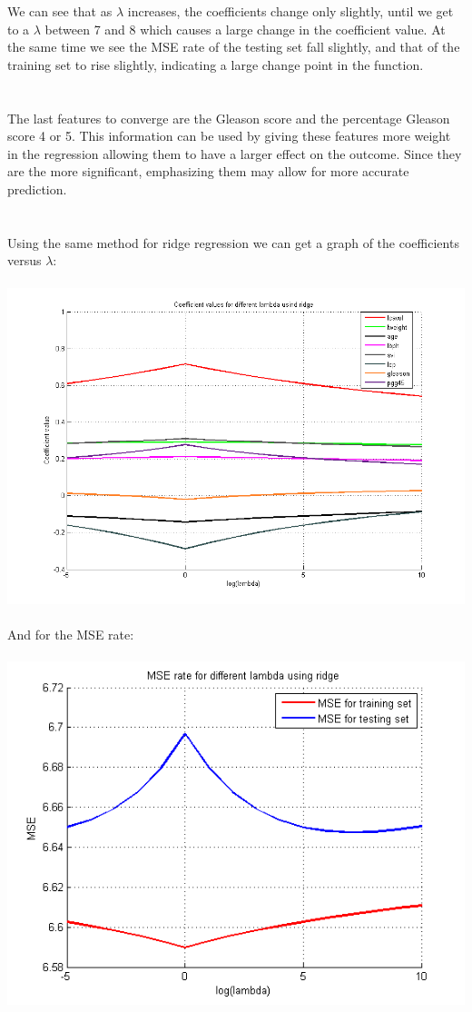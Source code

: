 \documentclass[paper=a4, fontsize=11pt]{scrartcl} %
\numberwithin{equation}{section} %
\numberwithin{figure}{section} %
\numberwithin{table}{section} %
\begin{document}
	We can see that as $\lambda$ increases, the coefficients change only slightly, until we get to a $\lambda$ between 7 and 8 which causes a large change in the coefficient value. At the same time we see the MSE rate of the testing set fall slightly, and that of the training set to rise slightly, indicating a large change point in the function. 
	\\\\\\
	The last features to converge are the Gleason score and the percentage Gleason score 4 or 5. This information can be used by giving these features more weight in the regression allowing them to have a larger effect on the outcome. Since they are the more significant, emphasizing them may allow for more accurate prediction.
	\\\\\\
	Using the same method for ridge regression we can get a graph of the coefficients versus $\lambda$:
	\\\\
	\hspace*{-3cm}\includegraphics[scale=0.8]{coeff_vs_lambda_ridge}
	\\\\
	And for the MSE rate:
	\\\\
	\includegraphics[]{MSE_vs_lambda_ridge}
\end{document}
